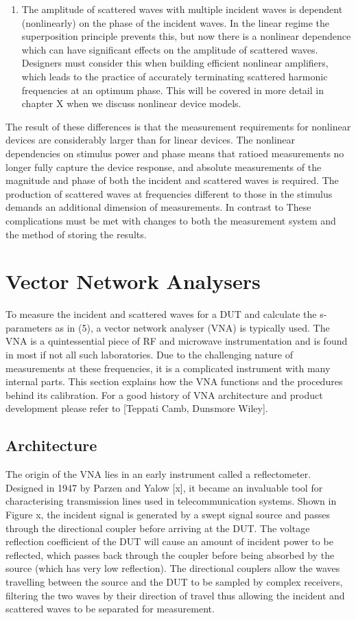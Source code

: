 \documentclass[../thesis.tex]{subfiles}
\begin{document}
\begin{refsection}
\begin{enumerate}
\item The amplitude of scattered waves with multiple incident waves is dependent (nonlinearly) on the phase of the incident waves. In the linear regime the superposition principle prevents this, but now there is a nonlinear dependence which can have significant effects on the amplitude of scattered waves. Designers must consider this when building efficient nonlinear amplifiers, which leads to the practice of accurately terminating scattered harmonic frequencies at an optimum phase. This will be covered in more detail in chapter X when we discuss nonlinear device models. 
\end{enumerate}
The result of these differences is that the measurement requirements for nonlinear devices are considerably larger than for linear devices. The nonlinear dependencies on stimulus power and phase means that ratioed measurements no longer fully capture the device response, and absolute measurements of the magnitude and phase of both the incident and scattered waves is required. The production of scattered waves at frequencies different to those in the stimulus demands an additional dimension of measurements. In contrast to These complications must be met with changes to both the measurement system and the method of storing the results.

\section{Vector Network Analysers}

To measure the incident and scattered waves for a DUT and calculate the s-parameters as in (5), a vector network analyser (VNA) is typically used. The VNA is a quintessential piece of RF and microwave instrumentation and is found in most if not all such laboratories. Due to the challenging nature of measurements at these frequencies, it is a complicated instrument with many internal parts. This section explains how the VNA functions and the procedures behind its calibration. For a good history of VNA architecture and product development please refer to [Teppati Camb, Dunsmore Wiley].

\subsection{Architecture}

The origin of the VNA lies in an early instrument called a reflectometer. Designed in 1947 by Parzen and Yalow [x], it became an invaluable tool for characterising transmission lines used in telecommunication systems. Shown in Figure x, the incident signal is generated by a swept signal source and passes through the directional coupler before arriving at the DUT. The voltage reflection coefficient of the DUT will cause an amount of incident power to be reflected, which passes back through the coupler before being absorbed by the source (which has very low reflection). The directional couplers allow the waves travelling between the source and the DUT to be sampled by complex receivers, filtering the two waves by their direction of travel thus allowing the incident and scattered waves to be separated for measurement. 


\end{refsection}
\end{document}
